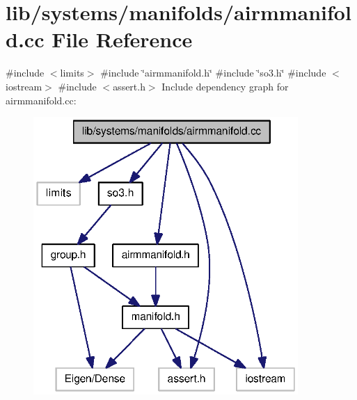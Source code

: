 \section{lib/systems/manifolds/airmmanifold.cc \-File \-Reference}
\label{airmmanifold_8cc}
{\ttfamily \#include $<$limits$>$}\*
{\ttfamily \#include \char`\"{}airmmanifold.\-h\char`\"{}}\*
{\ttfamily \#include \char`\"{}so3.\-h\char`\"{}}\*
{\ttfamily \#include $<$iostream$>$}\*
{\ttfamily \#include $<$assert.\-h$>$}\*
\-Include dependency graph for airmmanifold.\-cc\-:
\nopagebreak
\begin{figure}[H]
\begin{center}
\leavevmode
\includegraphics[width=285pt]{airmmanifold_8cc__incl}
\end{center}
\end{figure}
